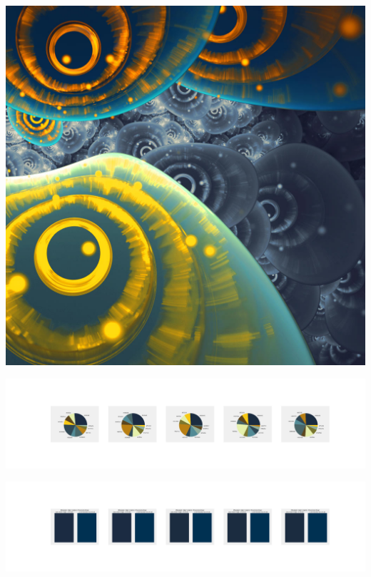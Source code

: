 \documentclass[11pt]{article}
\begin{document}
\begin{landscape}
    \begin{center}
    \includegraphics[width=\textwidth]{./nbimg/file (307).jpg}
    \end{center}

    \begin{center}
    \includegraphics[width=250mm]{./nbimg/pie-231.jpg}
    \end{center}

    \begin{center}
    \includegraphics[width=250mm]{./nbimg/peak-231.jpg}
    \end{center}
    


\end{landscape}
\end{document}
